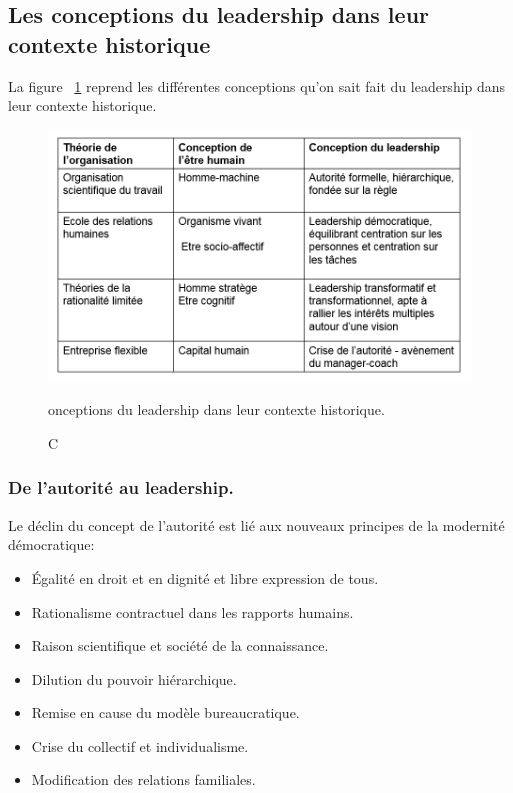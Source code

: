 \documentclass[12pt]{article}
\begin{document}
	\subsection{Les conceptions du leadership dans leur contexte historique}
	
	La figure ~\ref{conceptions_leaderships} reprend les différentes conceptions qu'on sait fait du leadership dans leur contexte historique.

	\begin{figure}[h]
		\begin{center}
		\includegraphics[scale=0.6]{conceptions_leaderships.png}
		\caption Conceptions du leadership dans leur contexte historique.
		\label{conceptions_leaderships}
		\end{center}
	\end{figure}
	
	
	\subsubsection{De l'autorité au leadership.}
	
	Le déclin du concept de l'autorité est lié aux nouveaux principes de la modernité démocratique:
	\begin{itemize}
	\item Égalité en droit et en dignité et libre expression de tous.
	\item Rationalisme contractuel dans les rapports humains.
	\item Raison scientifique et société de la connaissance.
	\item Dilution du pouvoir hiérarchique.
	\item Remise en cause du modèle bureaucratique.
	\item Crise du collectif et individualisme.
	\item Modification des relations familiales. \newline
	\end{itemize}
	
\end{document}
